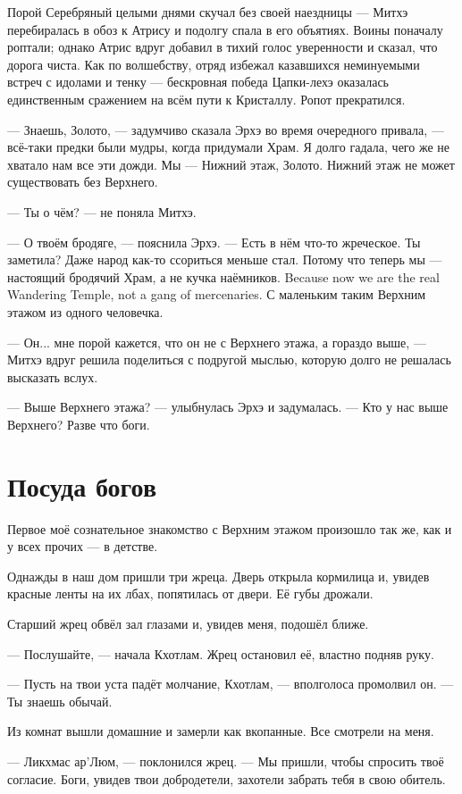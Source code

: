 Порой Серебряный целыми днями скучал без своей наездницы --- Митхэ перебиралась в обоз к Атрису и подолгу спала в его объятиях.
Воины поначалу роптали;
однако Атрис вдруг добавил в тихий голос уверенности и сказал, что дорога чиста.
Как по волшебству, отряд избежал казавшихся неминуемыми встреч с идолами и тенку --- бескровная победа Цапки-лехэ оказалась единственным сражением на всём пути к
Кристаллу.
Ропот прекратился.

--- Знаешь, Золото, --- задумчиво сказала Эрхэ во время очередного привала, --- всё-таки предки были мудры, когда придумали Храм.
Я долго гадала, чего же не хватало нам все эти дожди.
Мы --- Нижний этаж, Золото.
Нижний этаж не может существовать без Верхнего.

--- Ты о чём? --- не поняла Митхэ.

--- О твоём бродяге, --- пояснила Эрхэ.
--- Есть в нём что-то жреческое.
Ты заметила?
Даже народ как-то ссориться меньше стал.
{Потому что теперь мы --- настоящий бродячий Храм, а не кучка наёмников.}
{Because now we are the real Wandering Temple, not a gang of mercenaries.}
С маленьким таким Верхним этажом из одного человечка.

--- Он... мне порой кажется, что он не с Верхнего этажа, а гораздо выше, --- Митхэ вдруг решила поделиться с подругой мыслью, которую долго не решалась высказать вслух.

--- Выше Верхнего этажа? --- улыбнулась Эрхэ и задумалась.
--- Кто у нас выше Верхнего?
Разве что боги.

\section{Посуда богов}

Первое моё сознательное знакомство с Верхним этажом произошло так же, как и у всех прочих --- в детстве.

Однажды в наш дом пришли три жреца.
Дверь открыла кормилица и, увидев красные ленты на их лбах, попятилась от двери.
Её губы дрожали.

Старший жрец обвёл зал глазами и, увидев меня, подошёл ближе.

--- Послушайте, --- начала Кхотлам.
Жрец остановил её, властно подняв руку.

--- Пусть на твои уста падёт молчание, Кхотлам, --- вполголоса промолвил он.
--- Ты знаешь обычай.

Из комнат вышли домашние и замерли как вкопанные.
Все смотрели на меня.

--- Ликхмас ар’Люм, --- поклонился жрец.
--- Мы пришли, чтобы спросить твоё согласие.
Боги, увидев твои добродетели, захотели забрать тебя в свою обитель.

